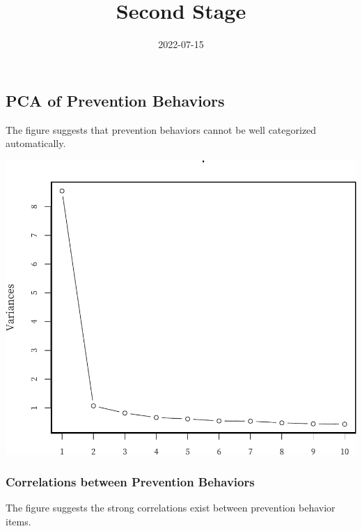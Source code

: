 \documentclass[
]{article}
\title{Second Stage}
\author{}
\date{\vspace{-2.5em}2022-07-15}
\begin{document}
\maketitle

{
\setcounter{tocdepth}{2}
\tableofcontents
}
\newpage

\hypertarget{pca-of-prevention-behaviors}{%
\subsection{PCA of Prevention
Behaviors}\label{pca-of-prevention-behaviors}}

The figure suggests that prevention behaviors cannot be well categorized
automatically.

\includegraphics{SecondPhase_files/figure-latex/PCA plot-1.pdf}

\newpage

\hypertarget{correlations-between-prevention-behaviors}{%
\subsubsection{Correlations between Prevention
Behaviors}\label{correlations-between-prevention-behaviors}}

The figure suggests the strong correlations exist between prevention
behavior items.
\end{document}
